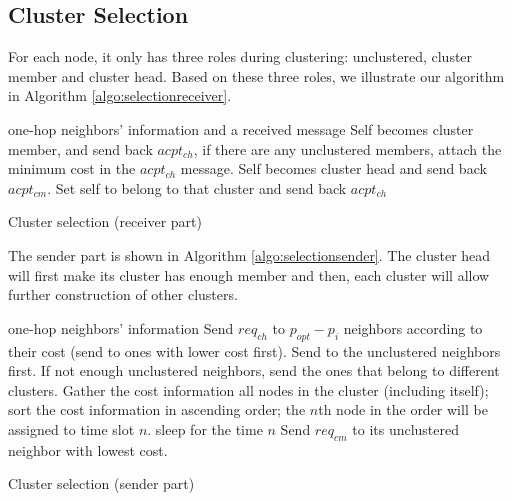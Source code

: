 \subsection{Cluster Selection}
For each node, it only has three roles during clustering: unclustered, cluster member and cluster head. Based on these three roles, we illustrate our algorithm in Algorithm \ref{algo:selectionreceiver}. 

\begin{algorithm}
\begin{algorithmic}
\REQUIRE one-hop neighbors' information and a received message
		\STATE Self becomes cluster member, and send back \(acpt_{ch}\), if there are any unclustered members, attach the minimum cost in the \(acpt_{ch}\) message.
		\STATE Self becomes cluster head and send back \(acpt_{cm}\).
	\ENDIF
{}
		\STATE Set self to belong to that cluster and send back \(acpt_{ch}\)
	\ENDIF
\ENDIF
\end{algorithmic}
\caption{Cluster selection (receiver part)}
\label{algo:selectionreceiver}
\end{algorithm}

The sender part is shown in Algorithm \ref{algo:selectionsender}. The cluster head will first make its cluster has enough member and then, each cluster will allow further construction of other clusters.

\begin{algorithm}
\begin{algorithmic}
\REQUIRE one-hop neighbors' information 
	\STATE Send \(req_{ch}\) to \(p_{opt}-p_i\) neighbors according to their cost (send to ones with lower cost first). Send to the unclustered neighbors first. If not enough unclustered neighbors, send the ones that belong to different clusters.
\ENDIF
{}
	\STATE Gather the cost information all nodes in the cluster (including itself); sort the cost information in ascending order; the \(n\)th node in the order will be assigned to time slot \(n\).
\ENDIF
{}
	\STATE sleep for the time \(n\)
	\STATE Send \(req_{cm}\) to its unclustered neighbor with lowest cost.
\ENDWHILE
\end{algorithmic}
\caption{Cluster selection (sender part)}
\label{algo:selectionsender}
\end{algorithm}

